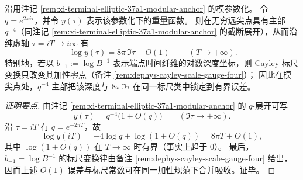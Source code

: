 \begin{conclusion}\label{con:xi-terminal-zm-timefiber-cusp-depth}
沿用注记 \ref{rem:xi-terminal-elliptic-37a1-modular-anchor} 的模参数化。
令 \(q=e^{2\pi i\tau}\)，并令 \(y(\tau)\) 表示该参数化下的重量函数。
则在无穷远尖点具有主部 \(q^{-4}\)（同注记 \ref{rem:xi-terminal-elliptic-37a1-modular-anchor} 的截断展开），从而沿纯虚轴 \(\tau=iT\to i\infty\) 有
\[
\boxed{\;
\log y(\tau)=8\pi\,\Im\tau+O(1)\;}
\qquad(T\to+\infty).
\]
特别地，若以 \(b_{-1}:=\log B^{-1}\) 表示端点时间纤维的对数深度坐标，则 Cayley 标尺变换只改变其加性零点（备注 \ref{rem:dephys-cayley-scale-gauge-four}）；
因此在模尖点处，\(q^{-4}\) 主部把该深度与 \(8\pi\,\Im\tau\) 在同一标尺类中锁定到有界误差。
\end{conclusion}
\begin{proof}[证明要点]
由注记 \ref{rem:xi-terminal-elliptic-37a1-modular-anchor} 的 \(q\)-展开可写
\[
y(\tau)=q^{-4}\bigl(1+O(q)\bigr)\qquad(\Im\tau\to+\infty).
\]
沿 \(\tau=iT\) 有 \(q=e^{-2\pi T}\)，故
\[
\log y(iT)=-4\log q+\log(1+O(q))=8\pi T+O(1),
\]
其中 \(\log(1+O(q))\) 在 \(T\to\infty\) 时有界（事实上趋于 \(0\)）。
最后，\(b_{-1}=\log B^{-1}\) 的标尺变换律由备注 \ref{rem:dephys-cayley-scale-gauge-four} 给出，因而上述 \(O(1)\) 误差与标尺常数可在同一加性规范下合并吸收。证毕。
\end{proof}

